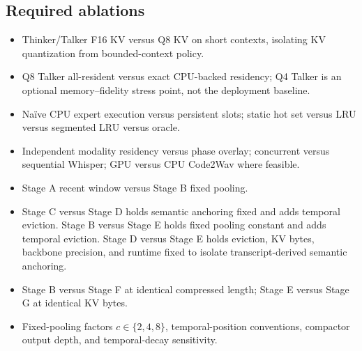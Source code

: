 \documentclass[10pt,letterpaper]{article}
\begin{document}
\subsection{Required ablations}
\begin{itemize}
    \item Thinker/Talker F16 KV versus Q8 KV on short contexts, isolating KV quantization from bounded-context policy.
    \item Q8 Talker all-resident versus exact CPU-backed residency; Q4 Talker is an optional memory--fidelity stress point, not the deployment baseline.
    \item Naïve CPU expert execution versus persistent slots; static hot set versus LRU versus segmented LRU versus oracle.
    \item Independent modality residency versus phase overlay; concurrent versus sequential Whisper; GPU versus CPU Code2Wav where feasible.
    \item Stage A recent window versus Stage B fixed pooling.
    \item Stage C versus Stage D holds semantic anchoring fixed and adds temporal eviction. Stage B versus Stage E holds fixed pooling constant and adds temporal eviction. Stage D versus Stage E holds eviction, KV bytes, backbone precision, and runtime fixed to isolate transcript-derived semantic anchoring.
    \item Stage B versus Stage F at identical compressed length; Stage E versus Stage G at identical KV bytes.
    \item Fixed-pooling factors $c\in\{2,4,8\}$, temporal-position conventions, compactor output depth, and temporal-decay sensitivity.
\end{itemize}
\end{document}
